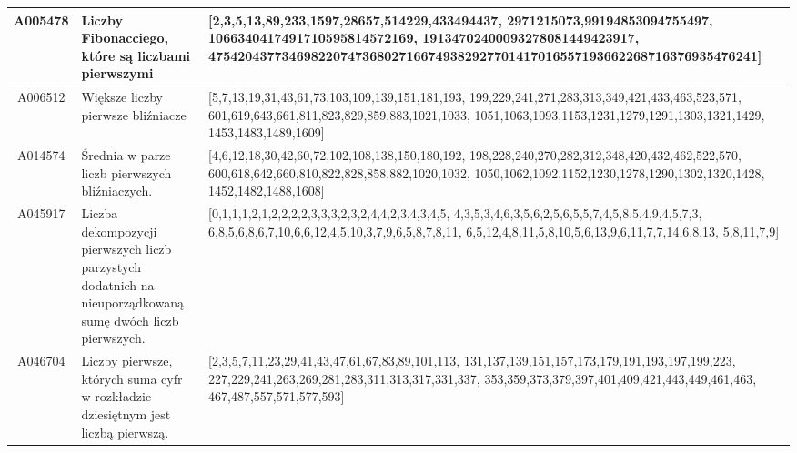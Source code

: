 \documentclass[10pt,onecolumn]{article}
\theoremstyle{definition}
\theoremstyle{hypothesis}
\theoremstyle{capability}
\begin{document}
\begin{landscape}
\begin{tabularx}{\linewidth}{ |c|X|X| }
  \hline
A005478 & Liczby Fibonacciego, które są liczbami pierwszymi & 
[2,3,5,13,89,233,1597,28657,514229,433494437,
 2971215073,99194853094755497,
 1066340417491710595814572169,
 19134702400093278081449423917,
 475420437734698220747368027166749382927701417016557193662268716376935476241] \\
 \hline
A006512 & Większe liczby pierwsze bliźniacze & 
[5,7,13,19,31,43,61,73,103,109,139,151,181,193,
 199,229,241,271,283,313,349,421,433,463,523,571,
 601,619,643,661,811,823,829,859,883,1021,1033,
 1051,1063,1093,1153,1231,1279,1291,1303,1321,1429,
 1453,1483,1489,1609] \\
  \hline
A014574  & Średnia w parze liczb pierwszych bliźniaczych. & 
[4,6,12,18,30,42,60,72,102,108,138,150,180,192,
 198,228,240,270,282,312,348,420,432,462,522,570,
 600,618,642,660,810,822,828,858,882,1020,1032,
 1050,1062,1092,1152,1230,1278,1290,1302,1320,1428,
 1452,1482,1488,1608] \\
  \hline
A045917 & Liczba dekompozycji pierwszych liczb parzystych dodatnich na nieuporządkowaną sumę dwóch liczb pierwszych. & 
[0,1,1,1,2,1,2,2,2,2,3,3,3,2,3,2,4,4,2,3,4,3,4,5,
 4,3,5,3,4,6,3,5,6,2,5,6,5,5,7,4,5,8,5,4,9,4,5,7,3,
 6,8,5,6,8,6,7,10,6,6,12,4,5,10,3,7,9,6,5,8,7,8,11,
 6,5,12,4,8,11,5,8,10,5,6,13,9,6,11,7,7,14,6,8,13,
 5,8,11,7,9] \\
  \hline
A046704 & Liczby pierwsze, których suma cyfr w rozkładzie dziesiętnym jest liczbą pierwszą. & 
[2,3,5,7,11,23,29,41,43,47,61,67,83,89,101,113,
 131,137,139,151,157,173,179,191,193,197,199,223,
 227,229,241,263,269,281,283,311,313,317,331,337,
 353,359,373,379,397,401,409,421,443,449,461,463,
 467,487,557,571,577,593] \\
  \hline
\end{tabularx}

\end{landscape}

\newpage

\end{document}

